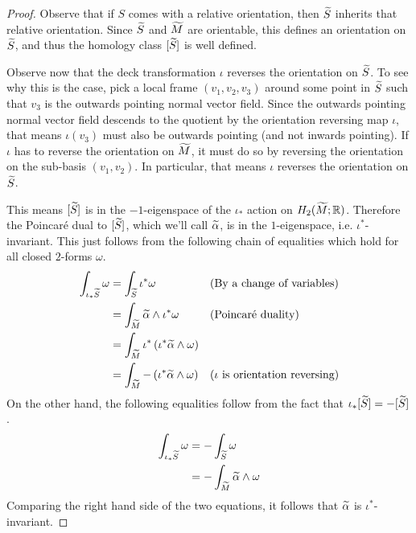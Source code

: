 \begin{proof}
  Observe that if $S$ comes with a relative orientation, then $\widetilde{S}$ inherits that relative
  orientation. Since $\widetilde{S}$ and $\widetilde{M}$ are orientable, this defines an orientation on $\widetilde{S}$,
  and thus the homology class $[\widetilde{S}]$ is well defined.

  Observe now that the deck transformation $\iota$ reverses the orientation on $\widetilde{S}$. To see why
  this is the case, pick a local frame $(v_1, v_2, v_3)$ around some point in $\widetilde{S}$ such that
  $v_3$ is the outwards pointing normal vector field. Since the outwards pointing normal vector
  field descends to the quotient by the orientation reversing map $\iota$, that means $\iota(v_3)$
  must also be outwards pointing (and not inwards pointing). If $\iota$ has to reverse the
  orientation on $\widetilde{M}$, it must do so by reversing the orientation on the sub-basis
  $(v_1, v_2)$. In particular, that means $\iota$ reverses the orientation on $\widetilde{S}$.

  This means $[\widetilde{S}]$ is in the $-1$-eigenspace of the $\iota_{\ast}$ action on
  $H_2(\widetilde{M}; \mathbb{R})$. Therefore the Poincar\'e dual to $[\widetilde{S}]$, which we'll call
  $\widetilde{\alpha}$, is in the $1$-eigenspace, i.e. $\iota^{\ast}$-invariant. This just follows from
  the following chain of equalities which hold for all closed $2$-forms $\omega$.
  \begin{align*}
    \int_{\iota_{\ast}\widetilde{S}} \omega &= \int_{\widetilde{S}} \iota^{\ast}\omega &&\text{(By a change of variables)} \\
                                     &= \int_{\widetilde{M}} \widetilde{\alpha} \wedge \iota^{\ast} \omega &&\text{(Poincar\'e duality)} \\
                                     &=\int_{\widetilde{M}} \iota^{\ast} \left( \iota^{\ast}\widetilde{\alpha} \wedge \omega \right) \\
    &= \int_{\widetilde{M}} - \left( \iota^{\ast} \widetilde{\alpha} \wedge \omega \right) &&\text{($\iota$ is orientation reversing)}
  \end{align*}
  On the other hand, the following equalities follow from the fact that
  $\iota_{\ast}[\widetilde{S}] = -[\widetilde{S}]$.
  \begin{align*}
    \int_{\iota_{\ast}\widetilde{S}} \omega &= - \int_{\widetilde{S}} \omega \\
                              &= - \int_{\widetilde{M}} \widetilde{\alpha} \wedge \omega
  \end{align*}
  Comparing the right hand side of the two equations, it follows that $\widetilde{\alpha}$ is
  $\iota^{\ast}$-invariant.
\end{proof}

